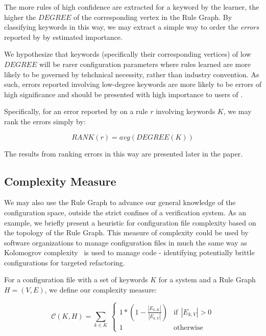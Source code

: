 
The more rules of high confidence are extracted for a keyword by the learner, 
the higher the $DEGREE$ of the corresponding vertex in the Rule Graph.
By classifying keywords in this way, we may extract a simple way to
order the {\it errors} reported by \app by estimated importance.

We hypothesize that keywords (specifically their corresponding vertices)
of low $DEGREE$ will be rarer configuration
parameters where rules learned are more likely to be governed by 
tehchnical necessity, rather than industry convention. As such, errors
reported involving low-degree keywords are more likely to be errors
of high significance and should be presented with high importance
to users of \app.

Specifically, for an error reported by \app on a rule $r$ involving
keywords $K$, we may rank the errors simply by:

    $$RANK(r) = avg( DEGREE(K) )$$

The results from ranking errors in this way are presented later in
the paper.

\subsection{Complexity Measure}

We may also use the Rule Graph to advance our general knowledge
of the configuration space, outside the strict confines of a
verification system. As an example, we briefly present a heuristic
for configuration file complexity based on the topology of the
Rule Graph. This measure of complexity could be used by software
organizations to manage configuration files in much the same way
as Kolomogrov complexity~\cite{kolomogrov} is used to manage code - identifying
potentially brittle configurations for targeted refactoring.


For a configuration file with a set of keywords $K$ for a system
and a Rule Graph $H = (V, E)$, we define our complexity measure:

\begin{equation}
    \mathcal{C}(K, H) = \sum_{k \in K} \
        \begin{cases}
            1 * (1 - \frac{|E_{k, K}|}{|E_{k, V}|}) & \text{if}\ \ |E_{k, V}| > 0 \\
            1 & \text{otherwise}
        \end{cases}
\end{equation}

